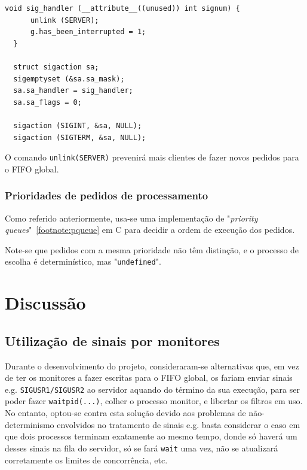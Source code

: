 \documentclass[11pt,a4paper]{report}%
\begin{document}
\label{code:server_signal}
\begin{lstlisting}[caption={Tratamento de sinais no servidor}]
  void sig_handler (__attribute__((unused)) int signum) {
      unlink (SERVER);
      g.has_been_interrupted = 1;
  }

  struct sigaction sa;
  sigemptyset (&sa.sa_mask);
  sa.sa_handler = sig_handler;
  sa.sa_flags = 0;

  sigaction (SIGINT, &sa, NULL);
  sigaction (SIGTERM, &sa, NULL);
\end{lstlisting}

O comando \lstinline{unlink(SERVER)} prevenirá mais clientes de fazer novos pedidos para o FIFO global.

\subsection{Prioridades de pedidos de processamento}

Como referido anteriormente, usa-se uma implementação de "\textit{priority queues}"~\ref{footnote:pqueue} em C
para decidir a ordem de execução dos pedidos.

Note-se que pedidos com a mesma prioridade não têm distinção, e o processo de escolha é determinístico,
mas "\lstinline|undefined|".

{\let\clearpage\relax \chapter{Discussão} \label{chap:disc} } %

\section{Utilização de sinais por monitores}

Durante o desenvolvimento do projeto, consideraram-se alternativas que, em vez de ter os monitores a fazer
escritas para o FIFO global, os fariam enviar sinais e.g. \texttt{SIGUSR1/SIGUSR2} ao servidor aquando do
término da sua execução, para ser poder fazer \lstinline{waitpid(...)}, colher o processo monitor, e libertar
os filtros em uso.\\

No entanto, optou-se contra esta solução devido aos problemas de não-determinismo envolvidos no tratamento de sinais
e.g. basta considerar o caso em que dois processos terminam exatamente ao mesmo tempo, donde só haverá um desses
sinais na fila do servidor, só se fará \lstinline{wait} uma vez, não se atualizará corretamente os limites de
concorrência, etc.
\end{document}
